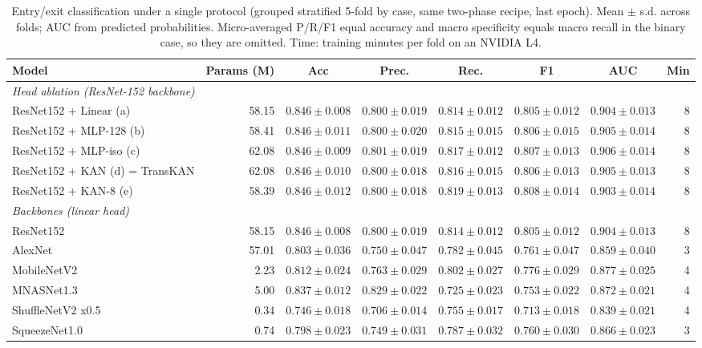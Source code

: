 \begin{table}[t]
\centering
\caption{Entry/exit classification under a single protocol (grouped stratified 5-fold by case, same two-phase recipe, last epoch). Mean $\pm$ s.d. across folds; AUC from predicted probabilities. Micro-averaged P/R/F1 equal accuracy and macro specificity equals macro recall in the binary case, so they are omitted. Time: training minutes per fold on an NVIDIA L4.}
\label{tab:protocolo_unico}
\footnotesize
\begin{tabular}{lrcccccr}
\hline
Model & Params (M) & Acc & Prec. & Rec. & F1 & AUC & Min \\
\hline
\multicolumn{8}{l}{\textit{Head ablation (ResNet-152 backbone)}} \\
ResNet152 + Linear (a) & 58.15 & $0.846 \pm 0.008$ & $0.800 \pm 0.019$ & $0.814 \pm 0.012$ & $0.805 \pm 0.012$ & $0.904 \pm 0.013$ & 8 \\
ResNet152 + MLP-128 (b) & 58.41 & $0.846 \pm 0.011$ & $0.800 \pm 0.020$ & $0.815 \pm 0.015$ & $0.806 \pm 0.015$ & $0.905 \pm 0.014$ & 8 \\
ResNet152 + MLP-iso (c) & 62.08 & $0.846 \pm 0.009$ & $0.801 \pm 0.019$ & $0.817 \pm 0.012$ & $0.807 \pm 0.013$ & $0.906 \pm 0.014$ & 8 \\
ResNet152 + KAN (d) = TransKAN & 62.08 & $0.846 \pm 0.010$ & $0.800 \pm 0.018$ & $0.816 \pm 0.015$ & $0.806 \pm 0.013$ & $0.905 \pm 0.013$ & 8 \\
ResNet152 + KAN-8 (e) & 58.39 & $0.846 \pm 0.012$ & $0.800 \pm 0.018$ & $0.819 \pm 0.013$ & $0.808 \pm 0.014$ & $0.903 \pm 0.014$ & 8 \\
\hline
\multicolumn{8}{l}{\textit{Backbones (linear head)}} \\
ResNet152 & 58.15 & $0.846 \pm 0.008$ & $0.800 \pm 0.019$ & $0.814 \pm 0.012$ & $0.805 \pm 0.012$ & $0.904 \pm 0.013$ & 8 \\
AlexNet & 57.01 & $0.803 \pm 0.036$ & $0.750 \pm 0.047$ & $0.782 \pm 0.045$ & $0.761 \pm 0.047$ & $0.859 \pm 0.040$ & 3 \\
MobileNetV2 & 2.23 & $0.812 \pm 0.024$ & $0.763 \pm 0.029$ & $0.802 \pm 0.027$ & $0.776 \pm 0.029$ & $0.877 \pm 0.025$ & 4 \\
MNASNet1.3 & 5.00 & $0.837 \pm 0.012$ & $0.829 \pm 0.022$ & $0.725 \pm 0.023$ & $0.753 \pm 0.022$ & $0.872 \pm 0.021$ & 4 \\
ShuffleNetV2 x0.5 & 0.34 & $0.746 \pm 0.018$ & $0.706 \pm 0.014$ & $0.755 \pm 0.017$ & $0.713 \pm 0.018$ & $0.839 \pm 0.021$ & 4 \\
SqueezeNet1.0 & 0.74 & $0.798 \pm 0.023$ & $0.749 \pm 0.031$ & $0.787 \pm 0.032$ & $0.760 \pm 0.030$ & $0.866 \pm 0.023$ & 3 \\

\end{tabular}
\end{table}

